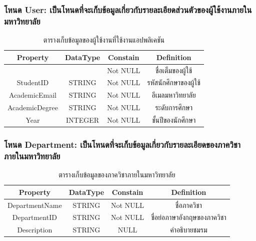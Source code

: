 \documentclass[14pt,oneside,openright,a4paper]{cpe-thai-project}
\begin{document}
    \subsubsection{โหนด User: เป็นโหนดที่จะเก็บข้อมูลเกี่ยวกับรายละเอียดส่วนตัวของผู้ใช้งานภายในมหาวิทยาลัย}
    \begin{table}[!h]\centering
      \begin{tabular}{|c|c|c|c|}
      \hline
      \rowcolor[HTML]{9FC5E8} 
      Property       & {\color[HTML]{242424} DataType} & Constain & Definition            \\ \hline
      \cellcolor[HTML]{FFFFFF}{\color[HTML]{242424} StudentName} & \cellcolor[HTML]{FFFFFF}{\color[HTML]{242424} STRING} & Not NULL & ชื่อเต็มของผู้ใช้ \\ \hline
      StudentID      & STRING                          & Not NULL & รหัสนักศึกษาของผู้ใช้ \\ \hline
      AcademicEmail  & STRING                          & Not NULL & อีเมลมหาวิทยาลัย      \\ \hline
      AcademicDegree & STRING                          & Not NULL & ระดับการศึกษา         \\ \hline
      Year           & INTEGER                         & Not NULL & ชั้นปีของนักศึกษา     \\ \hline
      \end{tabular}
      \caption{\centering ตารางเก็บข้อมูลของผู้ใช้งานที่ใช้งานแอปพลิเคชัน}\label{tab:User Node}
    \end{table}

    \newpage

    \subsubsection{โหนด Department: เป็นโหนดที่จะเก็บข้อมูลเกี่ยวกับรายละเอียดของภาควิชาภายในมหาวิทยาลัย}
    \begin{table}[!h]\centering
      \begin{tabular}{|c|c|c|c|}
      \hline
      \rowcolor[HTML]{9FC5E8} 
      Property       & DataType & Constain & Definition                  \\ \hline
      DepartmentName & STRING   & Not NULL & ชื่อภาควิชา                 \\ \hline
      DepartmentID   & STRING   & Not NULL & ชื่อย่อภาษาอังกฤษของภาควิชา \\ \hline
      Description    & STRING   & NULL     & คำอธิบายชมรม                \\ \hline
      \end{tabular}
      \caption{\centering ตารางเก็บข้อมูลของภาควิชาภายในมหาวิทยาลัย}\label{tab:Department Node}
    \end{table}
\end{document}
